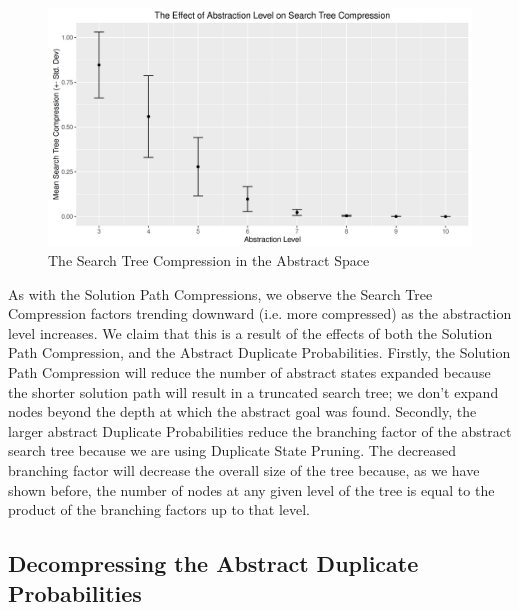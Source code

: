 \documentclass{article}
\begin{document}
\begin{figure}
  \centering
  \includegraphics[width=1\textwidth]{search_tree_compression_plot}
  \caption{The Search Tree Compression in the Abstract Space}
  \label{fig:stc}
\end{figure}

As with the Solution Path Compressions,
we observe the Search Tree Compression factors trending downward
(i.e. more compressed) as the abstraction level increases.
We claim that this is a result of the effects of both the Solution Path Compression, and the Abstract Duplicate Probabilities.
Firstly, the Solution Path Compression will reduce the number of abstract states expanded because the
shorter solution path will result in a truncated search tree;
we don't expand nodes beyond the depth at which the abstract goal was found.
Secondly, the larger abstract Duplicate Probabilities reduce the branching factor of the abstract search tree
because we are using Duplicate State Pruning. The decreased branching factor will decrease the overall
size of the tree because, as we have shown before, the number of nodes at any given level of the tree is equal to the product
of the branching factors up to that level.


\subsection{Decompressing the Abstract Duplicate Probabilities}
\end{document}
